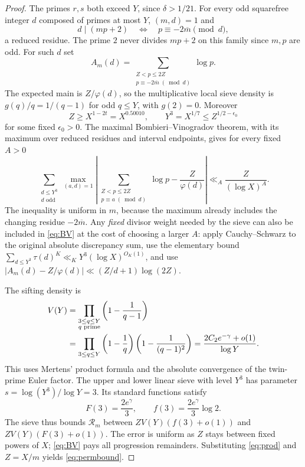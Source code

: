 \documentclass[11pt]{article}
\begin{document}
\begin{proof}
The primes $r,s$ both exceed $Y$, since $\delta>1/21$.
For every odd squarefree integer $d$ composed of primes at most $Y$,
$(m,d)=1$ and
\begin{equation}\label{eq:congruence}
 d\mid(mp+2)\quad\Longleftrightarrow\quad
 p\equiv-2\overline m\pmod d,
\end{equation}
a reduced residue.  The prime $2$ never divides $mp+2$ on
this family since $m,p$ are odd.  For such $d$ set
\[
 A_m(d)=\sum_{\substack{Z<p\le2Z\\p\equiv-2\overline m\;(\bmod d)}}
        \log p.
\]
The expected main is $Z/\varphi(d)$, so the multiplicative local
sieve density is $g(q)/q=1/(q-1)$ for odd $q\le Y$, with $g(2)=0$.
Moreover
\[
 Z\ge X^{1-2t}=X^{0.50010},\qquad
 Y^3=X^{1/7}\le Z^{1/2-\epsilon_0}
\]
for some fixed $\epsilon_0>0$.  The maximal
Bombieri--Vinogradov theorem, with its maximum over reduced residues
and interval endpoints, gives for every fixed $A>0$
\begin{equation}\label{eq:BV}
 \sum_{\substack{d\le Y^3\\d\text{ odd}}}
 \max_{(a,d)=1}
 \left|\sum_{\substack{Z<p\le2Z\\p\equiv a\;(\bmod d)}}
                 \log p-\frac Z{\varphi(d)}\right|
 \ll_A\frac{Z}{(\log X)^A}.
\end{equation}
The inequality is uniform in $m$, because the maximum already includes
the changing residue $-2\overline m$.  Any \emph{fixed} divisor weight
needed by the sieve can also be included in \eqref{eq:BV} at the cost
of choosing a larger $A$: apply Cauchy--Schwarz to the original
absolute discrepancy sum, use the elementary bound
$\sum_{d\le Y^3}\tau(d)^K\ll_K Y^3(\log X)^{O_K(1)}$,
and use $|A_m(d)-Z/\varphi(d)|\ll (Z/d+1)\log(2Z)$.

The sifting density is
\begin{align}\label{eq:prod}
 V(Y)&=\prod_{\substack{3\le q\le Y\\q\text{ prime}}}
           \left(1-\frac1{q-1}\right)\\
 &=\prod_{3\le q\le Y}\left(1-\frac1q\right)
                  \left(1-\frac1{(q-1)^2}\right)
  =\frac{2C_2e^{-\gamma}+o(1)}{\log Y}.
 \notag
\end{align}
This uses Mertens' product formula and the absolute convergence
of the twin-prime Euler factor.  The upper and lower linear sieve
with level $Y^3$ has parameter $s=\log(Y^3)/\log Y=3$.
Its standard functions satisfy
\[
 F(3)=\frac{2e^\gamma}{3},\qquad
 f(3)=\frac{2e^\gamma}{3}\log2.
\]
The sieve thus bounds $\mathcal R_m$ between
$ZV(Y)(f(3)+o(1))$ and $ZV(Y)(F(3)+o(1))$.
The error is uniform as $Z$ stays between fixed powers of $X$;
\eqref{eq:BV} pays all progression remainders.  Substituting
\eqref{eq:prod} and $Z=X/m$ yields \eqref{eq:permbound}.
\end{proof}
\end{document}
